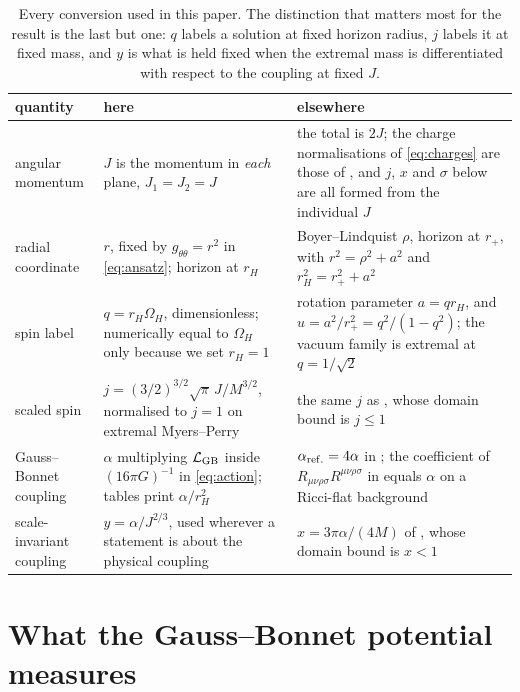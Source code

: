 \documentclass[11pt,a4paper]{article}
\begin{document}
\begin{table}[t]
 \centering\small
 \airyrows
 \begin{tabular}{@{}p{}p{}p{}@{}}
 \toprule
 quantity & here & elsewhere \\
 \midrule
 angular momentum &
 $J$ is the momentum in \emph{each} plane, $J_1=J_2=J$ &
 the total is $2J$; the charge normalisations of \eqref{eq:charges} are
 those of \cite{Brihaye:2010wp}, and $j$, $x$ and $\sigma$ below are all
 formed from the individual $J$ \\
 radial coordinate &
 $r$, fixed by $g_{\theta\theta}=r^2$ in \eqref{eq:ansatz}; horizon at $r_H$ &
 Boyer--Lindquist $\rho$, horizon at $r_+$, with $r^2=\rho^2+a^2$ and
 $r_H^2=r_+^2+a^2$ \\
 spin label &
 $q=r_H\Omega_H$, dimensionless; numerically equal to $\Omega_H$ only because
 we set $r_H=1$ &
 rotation parameter $a=qr_H$, and $u=a^2/r_+^2=q^2/(1-q^2)$;
 the vacuum family is extremal at $q=1/\sqrt2$ \\
 scaled spin &
 $j=(3/2)^{3/2}\sqrt\pi\,J/M^{3/2}$, normalised to $j=1$ on extremal
 Myers--Perry &
 the same $j$ as \cite{Kleihaus:2023zzs}, whose domain bound is $j\le1$ \\
 Gauss--Bonnet coupling &
 $\alpha$ multiplying $\mathcal L_{\mathrm{GB}}$ inside $(16\pi G)^{-1}$ in
 \eqref{eq:action}; tables print $\alpha/r_H^2$ &
 $\alpha_{\rm ref.}=4\alpha$ in \cite{Brihaye:2010wp};
 the coefficient of $R_{\mu\nu\rho\sigma}R^{\mu\nu\rho\sigma}$ in
 \cite{Wu:2024xnb} equals $\alpha$ on a Ricci-flat background \\
 scale-invariant coupling &
 $y=\alpha/J^{2/3}$, used wherever a statement is about the physical coupling &
 $x=3\pi\alpha/(4M)$ of \cite{Kleihaus:2023zzs}, whose domain bound is $x<1$ \\
 \bottomrule
 \end{tabular}
 \caption{Every conversion used in this paper. The distinction that matters
 most for the result is the last but one: $q$ labels a solution at fixed
 horizon radius, $j$ labels it at fixed mass, and $y$ is what is held fixed
 when the extremal mass is differentiated with respect to the coupling at
 fixed $J$.}
 \label{tab:conventions}
\end{table}

\section{What the Gauss--Bonnet potential measures}
\label{sec:potential}
\end{document}
